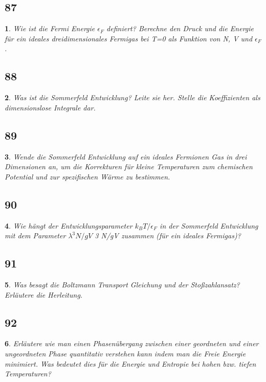 \documentclass[12pt,a4paper]{report}
\newtheorem{myfrag}{}%
\begin{document}
\subsection{87}
\begin{myfrag}
Wie ist die Fermi Energie $\epsilon _F$ definiert? Berechne den Druck und die Energie
für ein ideales dreidimensionales Fermigas bei T=0 als Funktion von N, V
und $\epsilon _F$.
\end{myfrag}
\subsection{88}
\begin{myfrag}
Was ist die Sommerfeld Entwicklung? Leite sie her. Stelle die Koeffizienten als
dimensionslose Integrale dar.
\end{myfrag}
\subsection{89}
\begin{myfrag}
Wende die Sommerfeld Entwicklung auf ein ideales Fermionen Gas in drei Dimensionen
an, um die Korrekturen für kleine Temperaturen zum chemischen Potential und zur
spezifischen Wärme zu bestimmen.
\end{myfrag}
\subsection{90}
\begin{myfrag}
Wie hängt der Entwicklungsparameter $k_B T/\epsilon_F$ in der Sommerfeld Entwicklung mit dem
Parameter $\lambda^3 N/gV$ 3 N/gV zusammen (für ein ideales Fermigas)?
\end{myfrag}
\subsection{91}
\begin{myfrag}
Was besagt die Boltzmann Transport Gleichung und der Stoßzahlansatz? Erläutere die
Herleitung.
\end{myfrag}
\subsection{92}
\begin{myfrag}
Erläutere wie man einen Phasenübergang zwischen einer geordneten und einer
ungeordneten Phase quantitativ verstehen kann indem man die Freie Energie minimiert.
Was bedeutet dies für die Energie und Entropie bei hohen bzw. tiefen Temperaturen?
\end{myfrag}
\end{document}
